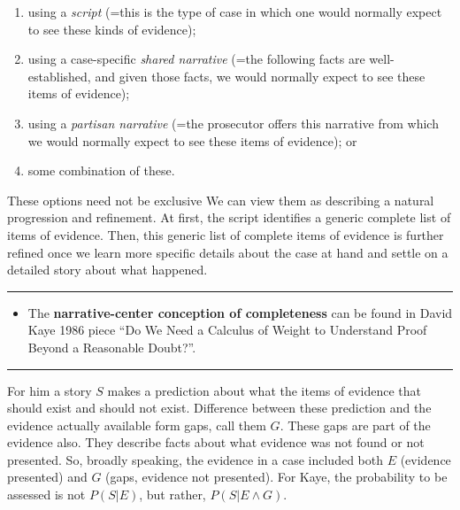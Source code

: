 \documentclass[
  10pt,
  dvipsnames,enabledeprecatedfontcommands]{scrartcl}
\providecommand{\tightlist}{%
  \setlength{\itemsep}{0pt}\setlength{\parskip}{0pt}}
\begin{document}
\begin{enumerate}
\def\labelenumi{(\alph{enumi})}
\item
  using a \emph{script} (=this is the type of case in which one would
  normally expect to see these kinds of evidence);
\item
  using a case-specific \emph{shared narrative} (=the following facts
  are well-established, and given those facts, we would normally expect
  to see these items of evidence);
\item
  using a \emph{partisan narrative} (=the prosecutor offers this
  narrative from which we would normally expect to see these items of
  evidence); or
\item
  some combination of these.
\end{enumerate}

These options need not be exclusive We can view them as describing a
natural progression and refinement. At first, the script identifies a
generic complete list of items of evidence. Then, this generic list of
complete items of evidence is further refined once we learn more
specific details about the case at hand and settle on a detailed story
about what happened.

\begin{center}\rule{0.5\linewidth}{0.5pt}\end{center}

\begin{itemize}
\tightlist
\item
  The \textbf{narrative-center conception of completeness} can be found
  in David Kaye 1986 piece ``Do We Need a Calculus of Weight to
  Understand Proof Beyond a Reasonable Doubt?''.
\end{itemize}

\begin{center}\rule{0.5\linewidth}{0.5pt}\end{center}

For him a story \(S\) makes a prediction about what the items of
evidence that should exist and should not exist. Difference between
these prediction and the evidence actually available form gaps, call
them \(G\). These gaps are part of the evidence also. They describe
facts about what evidence was not found or not presented. So, broadly
speaking, the evidence in a case included both \(E\) (evidence
presented) and \(G\) (gaps, evidence not presented). For Kaye, the
probability to be assessed is not \(P(S \vert E)\), but rather,
\(P(S \vert E \wedge G)\).
\end{document}
